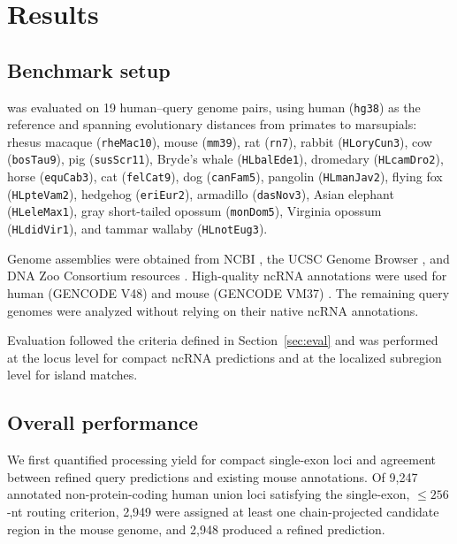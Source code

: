 \section{Results}
\label{sec:results}

\subsection{Benchmark setup}

\curia{} was evaluated on 19 human--query genome pairs, using human
(\texttt{hg38}) as the reference and spanning evolutionary distances from
primates to marsupials: rhesus macaque (\texttt{rheMac10}), mouse
(\texttt{mm39}), rat (\texttt{rn7}), rabbit (\texttt{HLoryCun3}), cow
(\texttt{bosTau9}), pig (\texttt{susScr11}), Bryde's whale
(\texttt{HLbalEde1}), dromedary (\texttt{HLcamDro2}), horse
(\texttt{equCab3}), cat (\texttt{felCat9}), dog (\texttt{canFam5}), pangolin
(\texttt{HLmanJav2}), flying fox (\texttt{HLpteVam2}), hedgehog
(\texttt{eriEur2}), armadillo (\texttt{dasNov3}), Asian elephant
(\texttt{HLeleMax1}), gray short-tailed opossum (\texttt{monDom5}), Virginia
opossum (\texttt{HLdidVir1}), and tammar wallaby (\texttt{HLnotEug3}).

Genome assemblies were obtained from NCBI
\citep{sayersDatabaseResourcesNational2022}, the UCSC Genome Browser
\citep{kentHumanGenomeBrowser2002}, and DNA Zoo Consortium resources
\citep{dudchenkoDeNovoAssembly2017}. High-quality ncRNA annotations were used
for human (GENCODE V48) and mouse (GENCODE VM37)
\citep{harrowGENCODEReferenceHuman2012}. The remaining query genomes were
analyzed without relying on their native ncRNA annotations.

Evaluation followed the criteria defined in Section~\ref{sec:eval} and was
performed at the locus level for compact ncRNA predictions and at the localized
subregion level for island matches.

\subsection{Overall performance}

We first quantified processing yield for compact single-exon loci and agreement
between refined query predictions and existing mouse annotations. Of 9{,}247
annotated non-protein-coding human union loci satisfying the single-exon,
$\leq256$-nt routing criterion, 2{,}949 were assigned at least one
chain-projected candidate region in the mouse genome, and 2{,}948 produced a
refined prediction.

